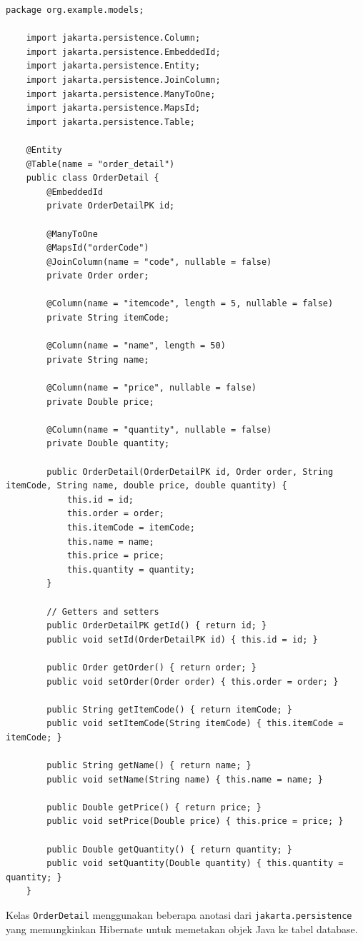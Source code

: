 \begin{lstlisting}[style=JavaStyle]
	package org.example.models;
	
	import jakarta.persistence.Column;
	import jakarta.persistence.EmbeddedId;
	import jakarta.persistence.Entity;
	import jakarta.persistence.JoinColumn;
	import jakarta.persistence.ManyToOne;
	import jakarta.persistence.MapsId;
	import jakarta.persistence.Table;
	
	@Entity
	@Table(name = "order_detail")
	public class OrderDetail {
		@EmbeddedId
		private OrderDetailPK id;
		
		@ManyToOne
		@MapsId("orderCode")
		@JoinColumn(name = "code", nullable = false)
		private Order order;
		
		@Column(name = "itemcode", length = 5, nullable = false)
		private String itemCode;
		
		@Column(name = "name", length = 50)
		private String name;
		
		@Column(name = "price", nullable = false)
		private Double price;
		
		@Column(name = "quantity", nullable = false)
		private Double quantity;
		
		public OrderDetail(OrderDetailPK id, Order order, String itemCode, String name, double price, double quantity) {
			this.id = id;
			this.order = order;
			this.itemCode = itemCode;
			this.name = name;
			this.price = price;
			this.quantity = quantity;
		}
		
		// Getters and setters
		public OrderDetailPK getId() { return id; }
		public void setId(OrderDetailPK id) { this.id = id; }
		
		public Order getOrder() { return order; }
		public void setOrder(Order order) { this.order = order; }
		
		public String getItemCode() { return itemCode; }
		public void setItemCode(String itemCode) { this.itemCode = itemCode; }
		
		public String getName() { return name; }
		public void setName(String name) { this.name = name; }
		
		public Double getPrice() { return price; }
		public void setPrice(Double price) { this.price = price; }
		
		public Double getQuantity() { return quantity; }
		public void setQuantity(Double quantity) { this.quantity = quantity; }
	}
\end{lstlisting}

Kelas \texttt{OrderDetail} menggunakan beberapa anotasi dari \texttt{jakarta.persistence} yang memungkinkan Hibernate untuk memetakan objek Java ke tabel database.

